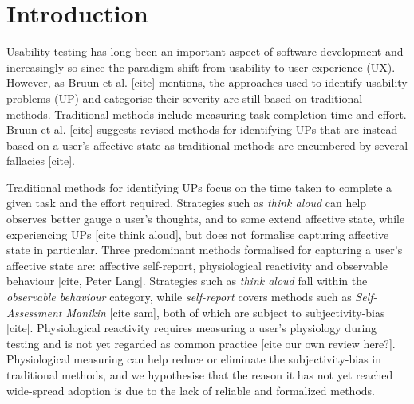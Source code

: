 	
\section{Introduction}



Usability testing has long been an important aspect of software development and
increasingly so since the paradigm shift from usability to user experience (UX).
However, as Bruun et al. [cite] mentions, the approaches used to identify
usability problems (UP) and categorise their severity are still based on
traditional methods. Traditional methods include measuring task completion time
and effort. Bruun et al. [cite] suggests revised methods for identifying UPs
that are instead based on a user's affective state as traditional methods are
encumbered by several fallacies [cite].

Traditional methods for identifying UPs focus on the time taken to complete a
given task and the effort required. Strategies such as \textit{think aloud} can
help observes better gauge a user's thoughts, and to some extend affective
state, while experiencing UPs [cite think aloud], but does not formalise
capturing affective state in particular. Three predominant methods formalised
for capturing a user's affective state are: affective self-report, physiological
reactivity and observable behaviour [cite, Peter Lang]. Strategies such as \textit{think
aloud} fall within the \textit{observable behaviour} category, while
\textit{self-report} covers methods such as \textit{Self-Assessment Manikin}
[cite sam], both of which are subject to subjectivity-bias [cite].
Physiological reactivity requires measuring a user's physiology during testing
and is not yet regarded as common practice [cite our own review here?].
Physiological measuring can help reduce or eliminate the subjectivity-bias in
traditional methods, and we hypothesise that the reason it has not yet reached
wide-spread adoption is due to the lack of reliable and formalized methods.

